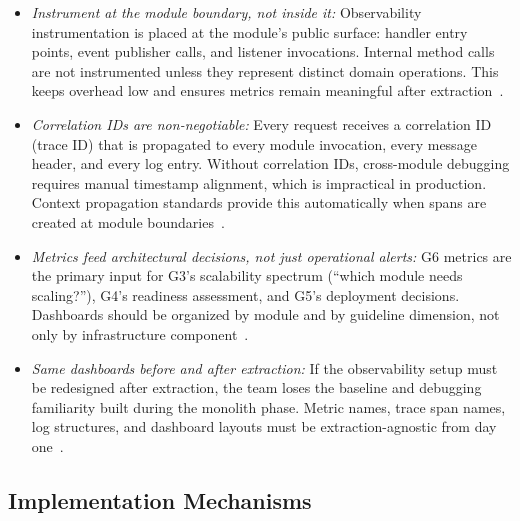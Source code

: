 \begin{itemize}[itemsep=8pt,topsep=2pt]
  \item \emph{Instrument at the module boundary, not inside it:} Observability instrumentation is placed at the module's public surface: handler entry points, event publisher calls, and listener invocations. Internal method calls are not instrumented unless they represent distinct domain operations. This keeps overhead low and ensures metrics remain meaningful after extraction~\cite{FordParsons2017}.

  \item \emph{Correlation IDs are non-negotiable:} Every request receives a correlation ID (trace ID) that is propagated to every module invocation, every message header, and every log entry. Without correlation IDs, cross-module debugging requires manual timestamp alignment, which is impractical in production. Context propagation standards provide this automatically when spans are created at module boundaries~\cite{richardson2018microservices,newman2019monolith}.

  \item \emph{Metrics feed architectural decisions, not just operational alerts:} G6 metrics are the primary input for G3's scalability spectrum (``which module needs scaling?''), G4's readiness assessment, and G5's deployment decisions. Dashboards should be organized by module and by guideline dimension, not only by infrastructure component~\cite{fairbanks2010justenough}.

  \item \emph{Same dashboards before and after extraction:} If the observability setup must be redesigned after extraction, the team loses the baseline and debugging familiarity built during the monolith phase. Metric names, trace span names, log structures, and dashboard layouts must be extraction-agnostic from day one~\cite{ghemawat2023towards}.
\end{itemize}

\subsection*{Implementation Mechanisms}


